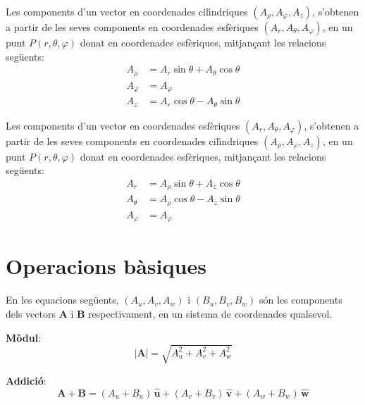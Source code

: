 \documentclass[catalan,a4paper,twoside,11pt]{article}
\begin{document}
Les components d'un vector en coordenades cil\'{\i}ndriques  $(A_\rho, A_\varphi, A_z)$, s'obtenen a partir de les seves components en coordenades esf\`{e}riques $(A_r, A_\theta, A_\varphi)$, en un punt $P(r,\theta,\varphi)$ donat en coordenades esf\`{e}riques, mitjan\c{c}ant les relacions seg\"{u}ents:
\begin{subequations}\begin{align}
    A_\rho &= A_r\sin\theta+A_\theta\cos\theta \\
    A_\varphi &= A_\varphi\\
    A_z &= A_r\cos\theta-A_\theta\sin\theta
\end{align}\end{subequations}

Les components d'un vector en coordenades esf\`{e}riques $(A_r, A_\theta, A_\varphi)$, s'obtenen a partir de les seves components en coordenades cil\'{\i}ndriques $(A_\rho, A_\varphi, A_z)$, en un punt $P(r,\theta,\varphi)$ donat en coordenades esf\`{e}riques, mitjan\c{c}ant les relacions seg\"{u}ents:
\begin{subequations}\begin{align}
    A_r &=  A_\rho\sin\theta+A_z\cos\theta\\
    A_\theta &=  A_\rho\cos\theta-A_z\sin\theta\\
    A_\varphi &= A_\varphi
\end{align}\end{subequations}


\section{Operacions  b\`{a}siques}
\renewcommand{\va}{\ensuremath{\,\boldsymbol{\hat{u}}}}
\renewcommand{\vb}{\ensuremath{\,\boldsymbol{\hat{v}}}}
\renewcommand{\vc}{\ensuremath{\,\boldsymbol{\hat{w}}}}

En les equacions seg\"{u}ents, $(A_u,A_v,A_w)$ i $(B_u,B_v,B_w)$
s\'{o}n les components dels vectors $\boldsymbol{A}$ i
$\boldsymbol{B}$ respectivament, en un sistema de coordenades
qualsevol.

\textbf{M\`{o}dul}:
\begin{equation}
    |\boldsymbol{A}|=  \sqrt{A_u^2 + A_v^2 + A_w^2}
\end{equation}

\textbf{Addici\'{o}}:
\begin{equation}
    \boldsymbol{A+B}= (A_u+B_u)\va + (A_v+B_v)\vb + (A_w+B_w)\vc
\end{equation}
\end{document}
